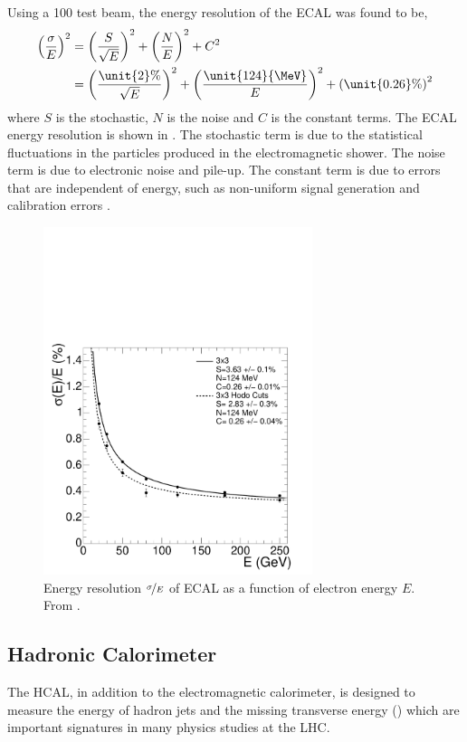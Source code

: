 Using a \unit{100}{\GeV} test beam, the energy resolution of the {ECAL} was
found to be\cite{chatrchyan2008cms},
\begin{align}
\left(\frac{\sigma}{E}\right)^{2} 
&= \left(\frac{S}{\sqrt{E}}\right)^{2} + \left(\frac{N}{E}\right)^{2} + C^{2}\\
&=
\left(\frac{\unit{2}{\%}}{\sqrt{E}}\right)^{2} +
\left(\frac{\unit{124}{\MeV}}{E}\right)^{2} + 
\left(\unit{0.26}{\%}\right)^{2}  
\end{align}
where $S$ is the stochastic, $N$ is the noise and $C$ is the constant terms.
The {ECAL} energy resolution is shown in .  The
stochastic term is due to the statistical fluctuations in the particles produced
in the electromagnetic shower. The noise term is due to electronic noise and
pile-up. The constant term is due to errors that are independent of energy, such
as non-uniform signal generation and calibration errors \cite{chatrchyan2008cms}.

\begin{figure}[htbp]
  \centering
  \includegraphics[width=0.7\textwidth]{ecal_performance}
  \caption{Energy resolution $\nicefrac{\sigma}{E}$ of ECAL as a function of
\label{fig:ECAL} electron energy $E$. From \cite{chatrchyan2008cms}.}
\end{figure}

\subsection{Hadronic Calorimeter}
The {HCAL}, in addition to the electromagnetic calorimeter,
is designed to measure the energy of hadron jets and the missing transverse
energy (\met) which are important signatures in many physics studies at the LHC.

